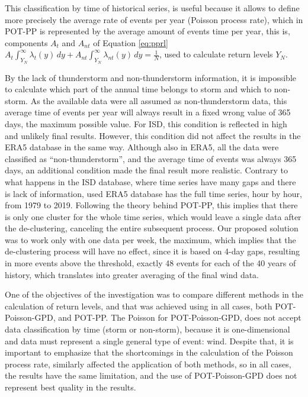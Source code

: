 \documentclass[12pt,oneside]{reedthesis}
\begin{document}
This classification by time of historical series, is useful because it allows to define more precisely the average rate of events per year (Poisson process rate), which in POT-PP is represented by the average amount of events time per year, this is, components \(A_t\) and \(A_{nt}\) of Equation \eqref{eq:pprl} \(A_t\int_{Y_N}^{\infty}\lambda_t\left( y\right)\,dy + A_{nt}\int_{Y_N}^{\infty}\lambda_{nt}\left( y\right)\,dy = \frac{1}{N}\), used to calculate return levels \(Y_N\).

By the lack of thunderstorm and non-thunderstorm information, it is impossible to calculate which part of the annual time belongs to storm and which to non-storm. As the available data were all assumed as non-thunderstorm data, this average time of events per year will always result in a fixed wrong value of 365 days, the maximum possible value. For ISD, this condition is reflected in high and unlikely final results. However, this condition did not affect the results in the ERA5 database in the same way. Although also in ERA5, all the data were classified as ``non-thunderstorm'', and the average time of events was always 365 days, an additional condition made the final result more realistic. Contrary to what happens in the ISD database, where time series have many gaps and there is lack of information, used ERA5 database has the full time series, hour by hour, from 1979 to 2019. Following the theory behind POT-PP, this implies that there is only one cluster for the whole time series, which would leave a single data after the de-clustering, canceling the entire subsequent process. Our proposed solution was to work only with one data per week, the maximum, which implies that the de-clustering process will have no effect, since it is based on 4-day gaps, resulting in more events above the threshold, exactly 48 events for each of the 40 years of history, which translates into greater averaging of the final wind data.

One of the objectives of the investigation was to compare different methods in the calculation of return levels, and that was achieved using in all cases, both POT-Poisson-GPD, and POT-PP. The Poisson for POT-Poisson-GPD, does not accept data classification by time (storm or non-storm), because it is one-dimensional and data must represent a single general type of event: wind. Despite that, it is important to emphasize that the shortcomings in the calculation of the Poisson process rate, similarly affected the application of both methods, so in all cases, the results have the same limitation, and the use of POT-Poisson-GPD does not represent best quality in the results.
\end{document}

